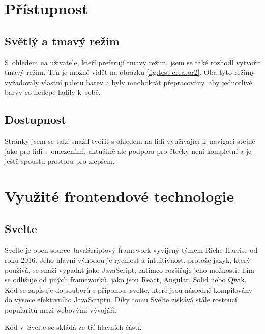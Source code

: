 \documentclass[12pt, a4paper,
openright
]{report}
\begin{document}
\section{Přístupnost}

\subsection{Světlý a tmavý režim}
S~ohledem na uživatele, kteří preferují tmavý režim, jsem se také rozhodl vytvořit tmavý režim. Ten je možné vidět na obrázku \ref{fig:test-creator2}. Oba tyto režimy vyžadovaly vlastní paletu barev a byly mnohokrát přepracovány, aby jednotlivé barvy co nejlépe ladily k~sobě.

\subsection{Dostupnost}
Stránky jsem se také snažil tvořit s ohledem na lidi využívající  k~navigaci stejně jako pro lidi s~omezeními, aktuálně ale podpora pro čtečky není kompletní a je ještě spoustu prostoru pro zlepšení.

\clearpage
\section{Využité frontendové technologie}
\subsection{Svelte}
Svelte je open-source JavaScriptový framework vyvíjený týmem Riche Harrise od roku 2016. Jeho hlavní výhodou je rychlost a intuitivnost, protože jazyk, který používá, se snaží vypadat jako JavaScript, zatímco rozšiřuje jeho možnosti. Tím se odlišuje od jiných frameworků, jako jsou React, Angular, Solid nebo Qwik. Kód se zapisuje do souborů s příponou .svelte, které jsou následně kompilovány do vysoce efektivního JavaScriptu. Díky tomu Svelte získává stále rostoucí popularitu mezi webovými vývojáři. 

Kód v~Svelte se skládá ze tří hlavních částí.
\end{document}
